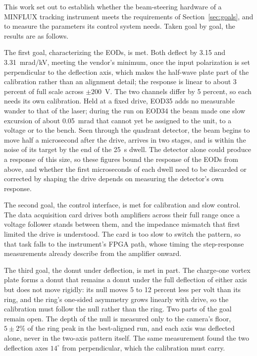 \documentclass{article}
\begin{document}
This work set out to establish whether the beam-steering hardware of a MINFLUX tracking instrument
meets the requirements of Section~\ref{sec:goals}, and to measure the parameters its control system
needs. Taken goal by goal, the results are as follows.

The first goal, characterizing the EODs, is met. Both deflect by 3.15 and 3.31~mrad/kV, meeting
the vendor's minimum, once the input polarization is set perpendicular to the deflection axis,
which makes the half-wave plate part of the calibration rather than an alignment detail; the
response is linear to about 3 percent of full scale across $\pm200$~V. The two channels differ by
5 percent, so each needs its own calibration. Held at a fixed drive, EOD35 adds no measurable
wander to that of the laser; during the run on EOD34 the beam made one slow excursion of about
0.05~mrad that cannot yet be assigned to the unit, to a voltage or to the bench. Seen through the
quadrant detector, the beam begins to move half a microsecond after the drive, arrives in two
stages, and is within the noise of its target by the end of the 25~\textmu s dwell. The detector
alone could produce a response of this size, so these figures bound the response of the EODs from
above, and whether the first microseconds of each dwell need to be discarded or corrected by
shaping the drive depends on measuring the detector's own response.

The second goal, the control interface, is met for calibration and slow control. The data
acquisition card drives both amplifiers across their full range once a voltage follower stands
between them, and the impedance mismatch that first limited the drive is understood. The card is
too slow to switch the pattern, so that task falls to the instrument's FPGA path, whose timing the
step-response measurements already describe from the amplifier onward.

The third goal, the donut under deflection, is met in part. The charge-one vortex plate forms a
donut that remains a donut under the full deflection of either axis but does not move rigidly:
its null moves 5 to 12 percent less per volt than its ring, and the ring's one-sided asymmetry
grows linearly with drive, so the calibration must follow the null rather than the ring. Two parts
of the goal remain open. The depth of the null is measured only to the camera's floor, $5\pm2\%$ of
the ring peak in the best-aligned run, and each axis was deflected alone, never in the
two-axis pattern itself. The same measurement found the two deflection axes $14^\circ$ from
perpendicular, which the calibration must carry.
\end{document}

